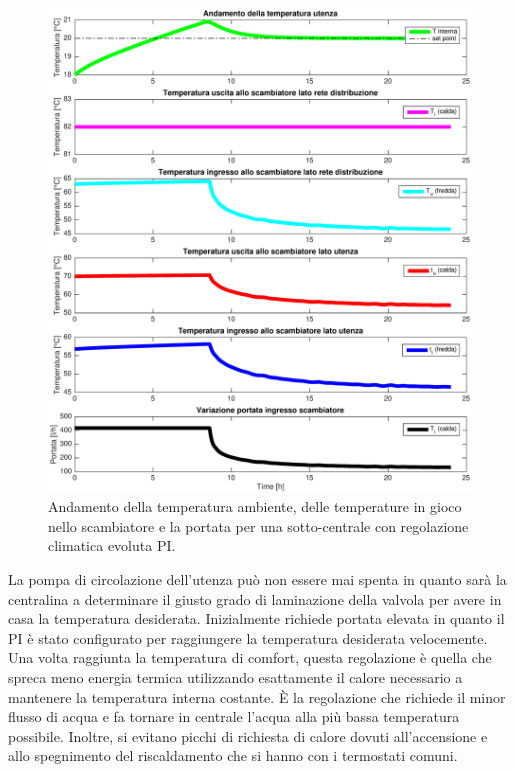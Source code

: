 \documentclass[laurea,oneside,11pt]{USiena_tesiLM}
\begin{document}
\begin{figure}[!ht]
\centering
\includegraphics[width=\textwidth]{figure/reg_PID} 
\caption{Andamento della temperatura ambiente, delle temperature in gioco nello scambiatore e la portata per una sotto-centrale con regolazione climatica evoluta PI.}
\label{fig:reg_PID}
\end{figure}

La pompa di circolazione dell'utenza può non essere mai spenta in quanto sarà la centralina a determinare il giusto grado di laminazione della valvola per avere in casa la temperatura desiderata. Inizialmente richiede portata elevata in quanto il PI è stato configurato per raggiungere la temperatura desiderata velocemente. Una volta raggiunta la temperatura di comfort, questa regolazione è quella che spreca meno energia termica utilizzando esattamente il calore necessario a mantenere la temperatura interna costante. È la regolazione che richiede il minor flusso di acqua e fa tornare in centrale l'acqua alla più bassa temperatura possibile.  Inoltre, si evitano picchi di richiesta di calore dovuti all'accensione e allo spegnimento del riscaldamento che si hanno con i termostati comuni. 
\end{document}
